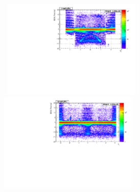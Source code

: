 \vspace{5mm}
\begin{minipage}{0.95\linewidth} 
\begin{center}
\centering
\mbox{
\includegraphics[height=0.55\textwidth, width=0.5\textwidth]{THESISPLOTS/SinglePhotonDataSet-TimeVsEta.pdf}
\includegraphics[height=0.55\textwidth, width=0.5\textwidth]{THESISPLOTS/SinglePhotonDataSet-TimeVsPhi.pdf}}
\label{fig:BKGPLOTS}
\end{center}
\end{minipage}

